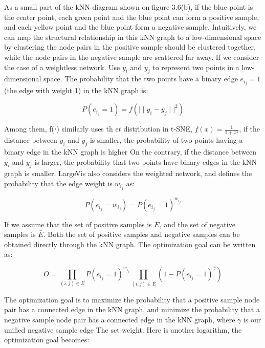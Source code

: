 \noindent As a small part of the kNN diagram shown on figure 3.6(b), if the blue point is the center point, each green point and the blue point can form a positive sample, and each yellow point and the blue point form a negative sample. Intuitively, we can map the structural relationship in this kNN graph to a low-dimensional space by clustering the node pairs in the positive sample should be clustered together, while the node pairs in the negative sample are scattered far away. If we consider the case of a weightless network. Use $y_i$ and $y_j$ to represent two points in a low-dimensional space. The probability that the two points have a binary edge $e_i_j=1$ (the edge with weight 1) in the kNN graph is:

\begin{equation*}
    P(e_i_j = 1) = f( {\mid \mid y_i - y_j \mid \mid} ^ 2)
\end{equation*}

\noindent Among them, f(⋅) similarly uses th e$t$ distribution in t-SNE, $f(x)= \frac{1}{1+x^2}$, if the distance between $y_i$ and $y_j$ is smaller, the probability of two points having a binary edge in the kNN graph is higher On the contrary, if the distance between $y_i$ and $y_j$ is larger, the probability that two points have binary edges in the kNN graph is smaller. LargeVis also considers the weighted network, and defines the probability that the edge weight is $w_i_j$ as:

\begin{equation*}
    P(e_i_j = w_i_j) = P(e_i_j = 1) ^ {w_i_j}
\end{equation*}

\noindent If we assume that the set of positive samples is $E$, and the set of negative samples is $\bar E$. Both the set of positive samples and negative samples can be obtained directly through the kNN graph. The optimization goal can be written as:

\begin{equation*}
    O = \prod_{(i,j)∈E} P(e_i_j = 1) ^ {w_i_j} \prod_{(i,j)∈\bar E} (1 - P(e_i_j = 1) ^ {\gamma}) 
\end{equation*}

\noindent The optimization goal is to maximize the probability that a positive sample node pair has a connected edge in the kNN graph, and minimize the probability that a negative sample node pair has a connected edge in the kNN graph, where $\gamma$ is our unified negative sample edge The set weight. Here is another logarithm, the optimization goal becomes:

